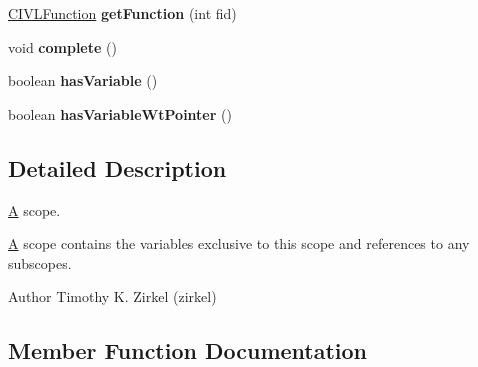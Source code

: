 \begin{DoxyCompactItemize}
\item 
\hypertarget{interfaceedu_1_1udel_1_1cis_1_1vsl_1_1civl_1_1model_1_1IF_1_1Scope_ac44a19cdfc026d38a067bd46b12b1d3c}{}\hyperlink{interfaceedu_1_1udel_1_1cis_1_1vsl_1_1civl_1_1model_1_1IF_1_1CIVLFunction}{C\+I\+V\+L\+Function} {\bfseries get\+Function} (int fid)\label{interfaceedu_1_1udel_1_1cis_1_1vsl_1_1civl_1_1model_1_1IF_1_1Scope_ac44a19cdfc026d38a067bd46b12b1d3c}

\item 
\hypertarget{interfaceedu_1_1udel_1_1cis_1_1vsl_1_1civl_1_1model_1_1IF_1_1Scope_ab5876756c32e62a3310d56f9777d4b3e}{}void {\bfseries complete} ()\label{interfaceedu_1_1udel_1_1cis_1_1vsl_1_1civl_1_1model_1_1IF_1_1Scope_ab5876756c32e62a3310d56f9777d4b3e}

\item 
\hypertarget{interfaceedu_1_1udel_1_1cis_1_1vsl_1_1civl_1_1model_1_1IF_1_1Scope_a74d52eb123d4eb5ac0a8a6bfc56b96d0}{}boolean {\bfseries has\+Variable} ()\label{interfaceedu_1_1udel_1_1cis_1_1vsl_1_1civl_1_1model_1_1IF_1_1Scope_a74d52eb123d4eb5ac0a8a6bfc56b96d0}

\item 
\hypertarget{interfaceedu_1_1udel_1_1cis_1_1vsl_1_1civl_1_1model_1_1IF_1_1Scope_a6c3f1144ab0ae203c371ecb67e14dc20}{}boolean {\bfseries has\+Variable\+Wt\+Pointer} ()\label{interfaceedu_1_1udel_1_1cis_1_1vsl_1_1civl_1_1model_1_1IF_1_1Scope_a6c3f1144ab0ae203c371ecb67e14dc20}

\end{DoxyCompactItemize}


\subsection{Detailed Description}
\hyperlink{structA}{A} scope. 

\hyperlink{structA}{A} scope contains the variables exclusive to this scope and references to any subscopes.

\begin{DoxyAuthor}{Author}
Timothy K. Zirkel (zirkel) 
\end{DoxyAuthor}


\subsection{Member Function Documentation}
\hypertarget{interfaceedu_1_1udel_1_1cis_1_1vsl_1_1civl_1_1model_1_1IF_1_1Scope_a62d8b932d5cae9253759986117c7f64a}{}
